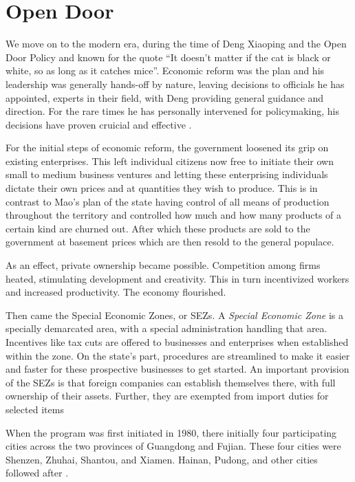 \section{Open Door}


We move on to the modern era, during the time of Deng Xiaoping and the Open Door
Policy and known for the quote ``It doesn't matter if the cat is black or white, so
as long as it catches mice''. Economic reform was the plan and his leadership
was generally hands-off by nature, leaving decisions to officials he has
appointed, experts in their field, with Deng providing general guidance and
direction. For the rare times he has personally intervened for policymaking, his
decisions have proven cruicial and effective \autocite{naughton_deng_1993}.

For the initial steps of economic reform, the government loosened its grip on
existing enterprises. This left individual citizens now free to initiate their own
small to medium business ventures and letting these enterprising individuals dictate
their own prices and at quantities they wish to produce. This is in contrast to
Mao's plan of the state having control of all means of production throughout the
territory and controlled how much and how many products of a certain kind are
churned out. After which these products are sold to the government at basement
prices which are then resold to the general populace.

As an effect, private ownership became possible. Competition among firms heated,
stimulating development and creativity. This in turn incentivized workers and
increased productivity. The economy flourished.


Then came the Special Economic Zones, or SEZs. A \emph{Special Economic Zone} is a
specially demarcated area, with a special administration handling that area.
Incentives like tax cuts are offered to businesses and enterprises when
established within the zone. On the state's part, procedures are streamlined to
make it easier and faster for these prospective businesses to get started.
An important provision of the SEZs is that foreign companies can establish
themselves there, with full ownership of their assets. Further, they are
exempted from import duties for selected items
\autocites{zeng_how_2011}{jaggi_chinas_1996}

When the program was first initiated in 1980, there initially four participating
cities across the two provinces of Guangdong and Fujian. These four cities were
Shenzen, Zhuhai, Shantou, and Xiamen. Hainan, Pudong, and other cities followed
after \autocite{jaggi_chinas_1996}.

